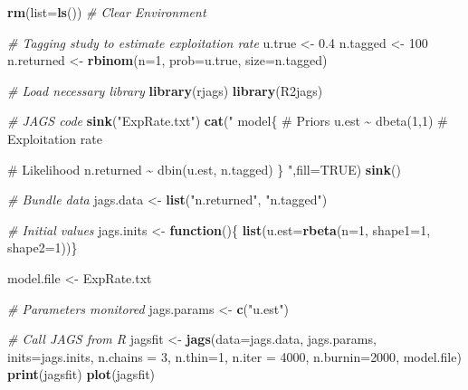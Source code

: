 \documentclass[
]{krantz}
\makeatletter
\newenvironment{Shaded}{\begin{snugshade}}{\end{snugshade}}
\newcommand{\AttributeTok}[1]{\textcolor[rgb]{0.27,0.27,0.27}{#1}}
\newcommand{\CommentTok}[1]{\textcolor[rgb]{0.37,0.37,0.37}{\textit{#1}}}
\newcommand{\ConstantTok}[1]{\textcolor[rgb]{0.37,0.37,0.37}{#1}}
\newcommand{\ControlFlowTok}[1]{\textcolor[rgb]{0.27,0.27,0.27}{\textbf{#1}}}
\newcommand{\DecValTok}[1]{\textcolor[rgb]{0.06,0.06,0.06}{#1}}
\newcommand{\FloatTok}[1]{\textcolor[rgb]{0.06,0.06,0.06}{#1}}
\newcommand{\FunctionTok}[1]{\textcolor[rgb]{0.27,0.27,0.27}{\textbf{#1}}}
\newcommand{\NormalTok}[1]{#1}
\newcommand{\OtherTok}[1]{\textcolor[rgb]{0.37,0.37,0.37}{#1}}
\newcommand{\StringTok}[1]{\textcolor[rgb]{0.5,0.5,0.5}{#1}}
\newenvironment{kframe}{%
\medskip{}
\setlength{\fboxsep}{.8em}
 \def\at@end@of@kframe{}%
 \ifinner\ifhmode%
  \def\at@end@of@kframe{\end{minipage}}%
  \begin{minipage}{\columnwidth}%
 \fi\fi%
 \def\FrameCommand##1{\hskip\@totalleftmargin \hskip-\fboxsep
 \colorbox{shadecolor}{##1}\hskip-\fboxsep
     \hskip-\linewidth \hskip-\@totalleftmargin \hskip\columnwidth}%
 \MakeFramed {\advance\hsize-\width
   \@totalleftmargin\z@ \linewidth\hsize
   \@setminipage}}%
 {\par\unskip\endMakeFramed%
 \at@end@of@kframe}
\renewenvironment{Shaded}{\begin{kframe}}{\end{kframe}}
\makeatother
\begin{document}
\begin{Shaded}
\begin{Highlighting}[]
\FunctionTok{rm}\NormalTok{(}\AttributeTok{list=}\FunctionTok{ls}\NormalTok{()) }\CommentTok{\# Clear Environment}

\CommentTok{\# Tagging study to estimate exploitation rate}
\NormalTok{u.true }\OtherTok{\textless{}{-}} \FloatTok{0.4}
\NormalTok{n.tagged }\OtherTok{\textless{}{-}} \DecValTok{100}
\NormalTok{n.returned }\OtherTok{\textless{}{-}} \FunctionTok{rbinom}\NormalTok{(}\AttributeTok{n=}\DecValTok{1}\NormalTok{, }\AttributeTok{prob=}\NormalTok{u.true, }\AttributeTok{size=}\NormalTok{n.tagged)}

\CommentTok{\# Load necessary library}
\FunctionTok{library}\NormalTok{(rjags)}
\FunctionTok{library}\NormalTok{(R2jags)}

\CommentTok{\# JAGS code}
\FunctionTok{sink}\NormalTok{(}\StringTok{"ExpRate.txt"}\NormalTok{)}
\FunctionTok{cat}\NormalTok{(}\StringTok{"}
\StringTok{model\{}
\StringTok{    \# Priors}
\StringTok{    u.est \textasciitilde{} dbeta(1,1)  \# Exploitation rate}

\StringTok{    \# Likelihood}
\StringTok{    n.returned \textasciitilde{} dbin(u.est, n.tagged)}
\StringTok{\}}
\StringTok{    "}\NormalTok{,}\AttributeTok{fill=}\ConstantTok{TRUE}\NormalTok{)}
\FunctionTok{sink}\NormalTok{()}

\CommentTok{\# Bundle data}
\NormalTok{jags.data }\OtherTok{\textless{}{-}} \FunctionTok{list}\NormalTok{(}\StringTok{"n.returned"}\NormalTok{, }\StringTok{"n.tagged"}\NormalTok{)}

\CommentTok{\# Initial values}
\NormalTok{jags.inits }\OtherTok{\textless{}{-}} \ControlFlowTok{function}\NormalTok{()\{ }\FunctionTok{list}\NormalTok{(}\AttributeTok{u.est=}\FunctionTok{rbeta}\NormalTok{(}\AttributeTok{n=}\DecValTok{1}\NormalTok{, }\AttributeTok{shape1=}\DecValTok{1}\NormalTok{, }\AttributeTok{shape2=}\DecValTok{1}\NormalTok{))\}}

\NormalTok{model.file }\OtherTok{\textless{}{-}} \StringTok{\textquotesingle{}ExpRate.txt\textquotesingle{}}

\CommentTok{\# Parameters monitored}
\NormalTok{jags.params }\OtherTok{\textless{}{-}} \FunctionTok{c}\NormalTok{(}\StringTok{"u.est"}\NormalTok{)}

\CommentTok{\# Call JAGS from R}
\NormalTok{jagsfit }\OtherTok{\textless{}{-}} \FunctionTok{jags}\NormalTok{(}\AttributeTok{data=}\NormalTok{jags.data, jags.params, }\AttributeTok{inits=}\NormalTok{jags.inits,}
                \AttributeTok{n.chains =} \DecValTok{3}\NormalTok{, }\AttributeTok{n.thin=}\DecValTok{1}\NormalTok{, }\AttributeTok{n.iter =} \DecValTok{4000}\NormalTok{, }\AttributeTok{n.burnin=}\DecValTok{2000}\NormalTok{,}
\NormalTok{                model.file)}
\FunctionTok{print}\NormalTok{(jagsfit)}
\FunctionTok{plot}\NormalTok{(jagsfit)}


\end{Highlighting}
\end{Shaded}
\end{document}
